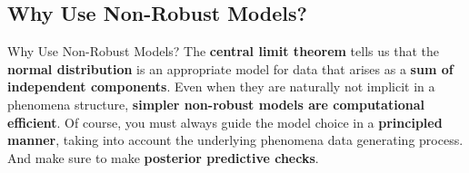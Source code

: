 \subsection{Why Use Non-Robust Models?}
\begin{frame}{Why Use Non-Robust Models?}
	The \textbf{central limit theorem} tells us that the \textbf{normal distribution}
	is an appropriate model for data that arises as a
	\textbf{sum of independent components}.
	\vfill
	Even when they are naturally not implicit in a phenomena structure,
	\textbf{simpler non-robust models are computational efficient}.
	\vfill
	Of course, you must always guide the model choice in a
	\textbf{principled manner},
	taking into account the underlying phenomena data generating process.
	And make sure to make \textbf{posterior predictive checks}.
\end{frame}
